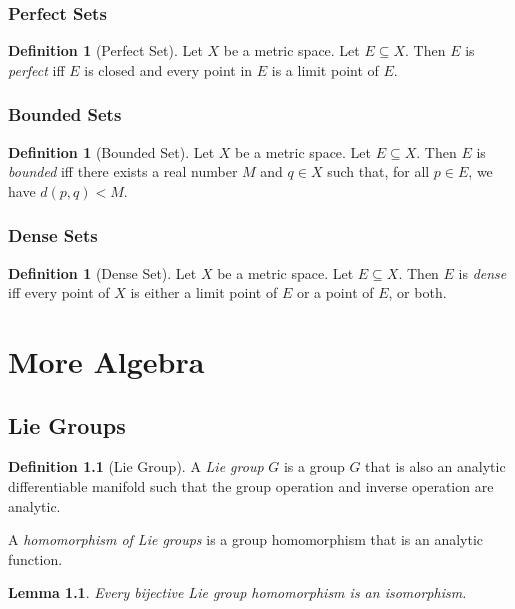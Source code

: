 \documentclass{book}
\newtheorem{lm}[prop]{Lemma}
\theoremstyle{definition}
\newtheorem{df}[prop]{Definition}
\begin{document}
\section{Perfect Sets}

\begin{df}[Perfect Set]
Let $X$ be a metric space. Let $E \subseteq X$. Then $E$ is \emph{perfect} iff $E$ is closed and every point in $E$ is a limit point of $E$.
\end{df}

\section{Bounded Sets}

\begin{df}[Bounded Set]
Let $X$ be a metric space. Let $E \subseteq X$. Then $E$ is \emph{bounded} iff there exists a real number $M$ and $q \in X$ such that, for all $p \in E$, we have $d(p,q) < M$.
\end{df}

\section{Dense Sets}

\begin{df}[Dense Set]
Let $X$ be a metric space. Let $E \subseteq X$. Then $E$ is \emph{dense} iff every point of $X$ is either a limit point of $E$ or a point of $E$, or both.
\end{df}

\part{More Algebra}

\chapter{Lie Groups}

\begin{df}[Lie Group]
A \emph{Lie group} $G$ is a group $G$ that is also an analytic differentiable manifold such that the group operation and inverse operation are analytic.

A \emph{homomorphism of Lie groups} is a group homomorphism that is an analytic function.
\end{df}

\begin{lm}
Every bijective Lie group homomorphism is an isomorphism.
\end{lm}
\end{document}
